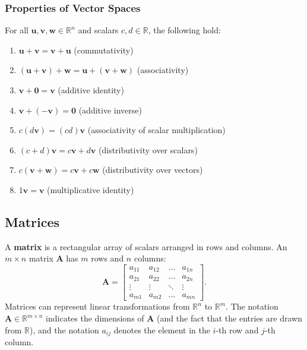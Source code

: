 \subsubsection{Properties of Vector Spaces}
For all $ \mathbf{u}, \mathbf{v}, \mathbf{w} \in \mathbb{R}^n $ and scalars $ c, d \in \mathbb{R} $, the following hold:
\begin{enumerate}
    \item $ \mathbf{u} + \mathbf{v} = \mathbf{v} + \mathbf{u} $ (commutativity)
    \item $ (\mathbf{u} + \mathbf{v}) + \mathbf{w} = \mathbf{u} + (\mathbf{v} + \mathbf{w}) $ (associativity)
    \item $ \mathbf{v} + \mathbf{0} = \mathbf{v} $ (additive identity)
    \item $ \mathbf{v} + (-\mathbf{v}) = \mathbf{0} $ (additive inverse)
    \item $ c(d\mathbf{v}) = (cd)\mathbf{v} $ (associativity of scalar multiplication)
    \item $ (c + d)\mathbf{v} = c\mathbf{v} + d\mathbf{v} $ (distributivity over scalars)
    \item $ c(\mathbf{v} + \mathbf{w}) = c\mathbf{v} + c\mathbf{w} $ (distributivity over vectors)
    \item $ 1\mathbf{v} = \mathbf{v} $ (multiplicative identity)
\end{enumerate}

\subsection{Matrices}
A \textbf{matrix} is a rectangular array of scalars arranged in rows and columns. An $ m \times n $ matrix $ \mathbf{A} $ has $ m $ rows and $ n $ columns:
\begin{equation*}
    \mathbf{A} = \begin{bmatrix} 
        a_{11} & a_{12} & \ldots & a_{1n} \\ 
        a_{21} & a_{22} & \ldots & a_{2n} \\ 
        \vdots & \vdots & \ddots & \vdots \\ 
        a_{m1} & a_{m2} & \ldots & a_{mn} 
    \end{bmatrix}.
\end{equation*}
Matrices can represent linear transformations from $ \mathbb{R}^n $ to $ \mathbb{R}^m $. The notation $ \mathbf{A} \in \mathbb{R}^{m \times n} $ indicates the dimensions of $ \mathbf{A} $ (and the fact that the entries are drawn from $\mathbb{R}$), and the notation $ a_{ij} $ denotes the element in the $ i $-th row and $ j $-th column.

